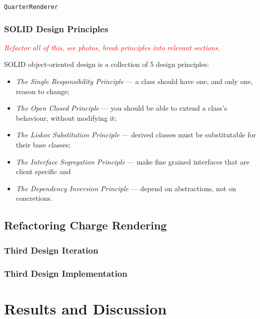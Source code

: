 \documentclass[nobib, a4paper, twoside, justified]{tufte-book}
\newcommand{\todo}[1]{{\noindent\textcolor{Red}{\textit{\quad#1}}\par}}
\begin{document}
\texttt{QuarterRenderer}

\subsection{SOLID Design Principles}%
\label{sub:solid_design_principles}

\todo{Refactor all of this, see photos, break principles into relevant sections.}

SOLID object-oriented design is a collection of 5 design principles:

\begin{itemize}
  \item \textit{The Single Responsibility Principle} --- a class should have one, and only one,
    reason to change;
  \item \textit{The Open Closed Principle} --- you should be able to extend a class's behaviour,
    without modifying it;
  \item \textit{The Liskov Substitution Principle} --- derived classes must be substitutable for
    their base classes;
  \item \textit{The Interface Segregation Principle} --- make fine grained interfaces that are
    client specific and
  \item \textit{The Dependency Inversion Principle} --- depend on abstractions, not on concretions.
\end{itemize}

\section{Refactoring Charge Rendering}%
\label{sec:refactoring_charge_rendering}

\subsection{Third Design Iteration}%
\label{sub:third_design_iteration}

\subsection{Third Design Implementation}%
\label{sub:third_design_implementation}



\chapter{Results and Discussion}%
\label{cha:results_and_discussion}
\end{document}
